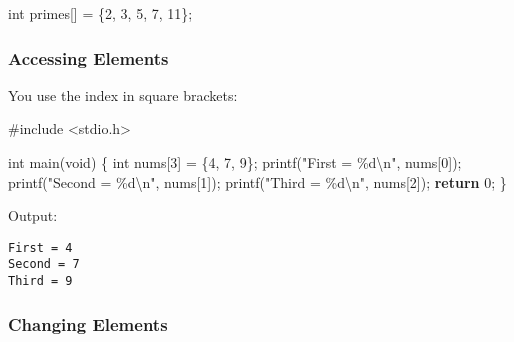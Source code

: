 \documentclass[
  letterpaper,
  DIV=11,
  numbers=noendperiod]{scrreprt}
\newenvironment{Shaded}{\begin{snugshade}}{\end{snugshade}}
\newcommand{\ControlFlowTok}[1]{\textcolor[rgb]{0.00,0.23,0.31}{\textbf{#1}}}
\newcommand{\DataTypeTok}[1]{\textcolor[rgb]{0.68,0.00,0.00}{#1}}
\newcommand{\DecValTok}[1]{\textcolor[rgb]{0.68,0.00,0.00}{#1}}
\newcommand{\ImportTok}[1]{\textcolor[rgb]{0.00,0.46,0.62}{#1}}
\newcommand{\NormalTok}[1]{\textcolor[rgb]{0.00,0.23,0.31}{#1}}
\newcommand{\OperatorTok}[1]{\textcolor[rgb]{0.37,0.37,0.37}{#1}}
\newcommand{\PreprocessorTok}[1]{\textcolor[rgb]{0.68,0.00,0.00}{#1}}
\newcommand{\SpecialCharTok}[1]{\textcolor[rgb]{0.37,0.37,0.37}{#1}}
\newcommand{\StringTok}[1]{\textcolor[rgb]{0.13,0.47,0.30}{#1}}
\begin{document}
\begin{Shaded}
\begin{Highlighting}[]
\DataTypeTok{int}\NormalTok{ primes}\OperatorTok{[]} \OperatorTok{=} \OperatorTok{\{}\DecValTok{2}\OperatorTok{,} \DecValTok{3}\OperatorTok{,} \DecValTok{5}\OperatorTok{,} \DecValTok{7}\OperatorTok{,} \DecValTok{11}\OperatorTok{\};}
\end{Highlighting}
\end{Shaded}

\subsubsection{Accessing Elements}\label{accessing-elements}

You use the index in square brackets:

\begin{Shaded}
\begin{Highlighting}[]
\PreprocessorTok{\#include }\ImportTok{\textless{}stdio.h\textgreater{}}

\DataTypeTok{int}\NormalTok{ main}\OperatorTok{(}\DataTypeTok{void}\OperatorTok{)} \OperatorTok{\{}
    \DataTypeTok{int}\NormalTok{ nums}\OperatorTok{[}\DecValTok{3}\OperatorTok{]} \OperatorTok{=} \OperatorTok{\{}\DecValTok{4}\OperatorTok{,} \DecValTok{7}\OperatorTok{,} \DecValTok{9}\OperatorTok{\};}
\NormalTok{    printf}\OperatorTok{(}\StringTok{"First = }\SpecialCharTok{\%d\textbackslash{}n}\StringTok{"}\OperatorTok{,}\NormalTok{ nums}\OperatorTok{[}\DecValTok{0}\OperatorTok{]);}
\NormalTok{    printf}\OperatorTok{(}\StringTok{"Second = }\SpecialCharTok{\%d\textbackslash{}n}\StringTok{"}\OperatorTok{,}\NormalTok{ nums}\OperatorTok{[}\DecValTok{1}\OperatorTok{]);}
\NormalTok{    printf}\OperatorTok{(}\StringTok{"Third = }\SpecialCharTok{\%d\textbackslash{}n}\StringTok{"}\OperatorTok{,}\NormalTok{ nums}\OperatorTok{[}\DecValTok{2}\OperatorTok{]);}
    \ControlFlowTok{return} \DecValTok{0}\OperatorTok{;}
\OperatorTok{\}}
\end{Highlighting}
\end{Shaded}

Output:

\begin{verbatim}
First = 4
Second = 7
Third = 9
\end{verbatim}

\subsubsection{Changing Elements}\label{changing-elements}
\end{document}
